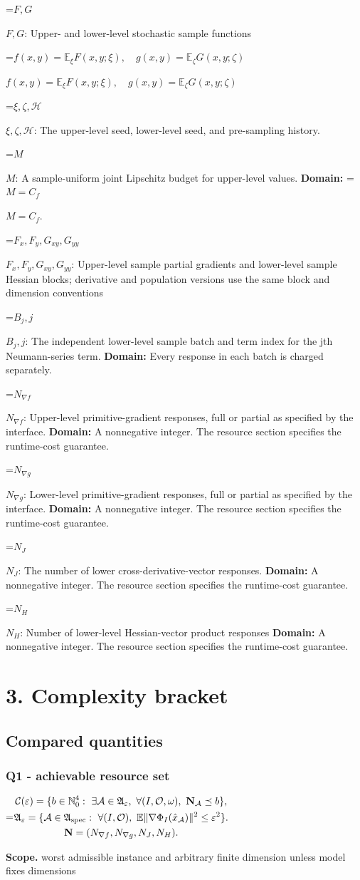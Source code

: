 \documentclass[10pt,a4paper]{article}
\newcommand{\AtlasMath}[1]{\par\begingroup\centering\setbox0=\hbox{$\displaystyle #1$}\ifdim\wd0>1.4\linewidth\typeout{ATLAS WIDE FORMULA: \the\wd0}\fi\ifdim\wd0>\linewidth\resizebox{\linewidth}{!}{\box0}\else\box0\fi\par\endgroup}
\newcommand{\AtlasInlineMath}[1]{\begingroup\setbox0=\hbox{$#1$}\ifdim\wd0>.4\linewidth\endgroup\AtlasMath{#1}\else\endgroup$#1$\fi}
\begin{document}
\AtlasInlineMath{F,G}: Upper- and lower-level stochastic sample functions

\AtlasInlineMath{f(x,y)=\mathbb E_\xi F(x,y;\xi),\quad g(x,y)=\mathbb E_\zeta G(x,y;\zeta)}

\AtlasInlineMath{\xi,\zeta,\mathcal H}: The upper-level seed, lower-level seed, and pre-sampling history.

\AtlasInlineMath{M}: A sample-uniform joint Lipschitz budget for upper-level values. \textbf{Domain:} \AtlasInlineMath{M=C_f}.

\AtlasInlineMath{F_x,F_y,G_{xy},G_{yy}}: Upper-level sample partial gradients and lower-level sample Hessian blocks; derivative and population versions use the same block and dimension conventions

\AtlasInlineMath{B_j,j}: The independent lower-level sample batch and term index for the jth Neumann-series term. \textbf{Domain:} Every response in each batch is charged separately.

\AtlasInlineMath{N_{\nabla f}}: Upper-level primitive-gradient responses, full or partial as specified by the interface. \textbf{Domain:} A nonnegative integer. The resource section specifies the runtime-cost guarantee.

\AtlasInlineMath{N_{\nabla g}}: Lower-level primitive-gradient responses, full or partial as specified by the interface. \textbf{Domain:} A nonnegative integer. The resource section specifies the runtime-cost guarantee.

\AtlasInlineMath{N_J}: The number of lower cross-derivative-vector responses. \textbf{Domain:} A nonnegative integer. The resource section specifies the runtime-cost guarantee.

\AtlasInlineMath{N_H}: Number of lower-level Hessian-vector product responses \textbf{Domain:} A nonnegative integer. The resource section specifies the runtime-cost guarantee.

\section{3. Complexity bracket}
\subsection{Compared quantities}
\subsubsection{Q1 - achievable resource set}
\AtlasMath{\begin{gathered}\mathcal C(\varepsilon)=\{b\in\mathbb N_0^4:\ \exists\mathcal A\in\mathfrak A_\varepsilon,\ \forall(I,\mathcal O,\omega),\ \mathbf N_{\mathcal A}\preceq b\},\\\mathfrak A_\varepsilon=\{\mathcal A\in\mathfrak A_{\rm spec}:\ \forall(I,\mathcal O),\ \mathbb E\|\nabla\Phi_I(\hat x_{\mathcal A})\|^2\le\varepsilon^2\}.\\\mathbf N=(N_{\nabla f},N_{\nabla g},N_J,N_H).\end{gathered}}
\textbf{Scope.} worst admissible instance and arbitrary finite dimension unless model fixes dimensions
\end{document}
